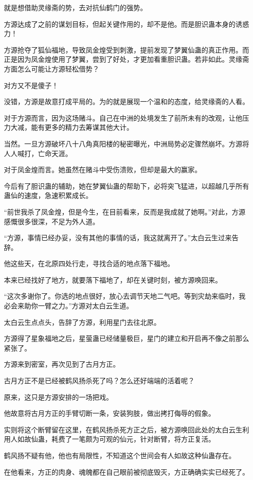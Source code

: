 \begin{this_body}
就是想借助灵缘斋的势，去对抗仙鹤门的强势。

方源达成了之前的谋划目标，但起关键作用的，却不是他。而是胆识蛊本身的诱惑力！

方源抢夺了狐仙福地，导致凤金煌受到刺激，提前发现了梦翼仙蛊的真正作用。而正是因为凤金煌使用了梦翼，尝到了好处，才更加看重胆识蛊。若非如此。灵缘斋方面怎么可能让方源轻松借势？

对方又不是傻子！

没错，方源是故意打成平局的。为的就是展现一个温和的态度，给灵缘斋的人看。

对于方源而言，因为这场赌斗。自己在中洲的处境发生了前所未有的改观，让他压力大减，能有更多的精力去筹谋其他大计。

当然。一旦方源破坏八十八角真阳楼的秘密曝光，中洲局势必定骤然崩坏。方源将人人喊打，亡命天涯。

对于凤金煌而言。她虽然在赌斗中受伤溃败，但却是最大的赢家。

今后有了胆识蛊的辅助，她在梦翼仙蛊的帮助下，必将突飞猛进，以超越几乎所有蛊仙的速度，急速积累成长。

“前世我杀了凤金煌，但是今生，在目前看来，反而是我成就了她啊。”对此，方源感慨很多很深，不足为外人道。

“方源，事情已经办妥，没有其他的事情的话，我这就离开了。”太白云生过来告辞。

他这些天，在北原四处行走，寻找合适的地点落下福地。

本来已经找好了地方，就要落下福地了，却在关键时刻，被方源唤回来。

“这次多谢你了。你选的地点很好，放心去调节天地二气吧。等到灾劫来临时，我必会来助你一臂之力。”方源对太白云生道。

太白云生点点头，告辞了方源，利用星门去往北原。

方源得了星象福地之后，星萤蛊已经储量极巨，星门的建立和开启再不像之前那么紧张了。

方源来到密室，再次见到了古月方正。

古月方正不是已经被鹤风扬杀死了吗？怎么还好端端的活着呢？

原来，这只是方源安排的一场把戏。

他故意将古月方正的手臂切断一条，安装狗肢，做出拷打侮辱的假象。

实则将这个断臂留在这里，在鹤风扬杀死方正之后，被方源唤回此处的太白云生利用人如故仙蛊，耗费了一笔颇为可观的仙元，针对断臂，将方正复活。

鹤风扬不疑有他，他也有局限性，不知道这个世间会有人如故这种仙蛊存在。

在他看来，方正的肉身、魂魄都在自己眼前被彻底毁灭，方正确确实实已经死了。


\end{this_body}

